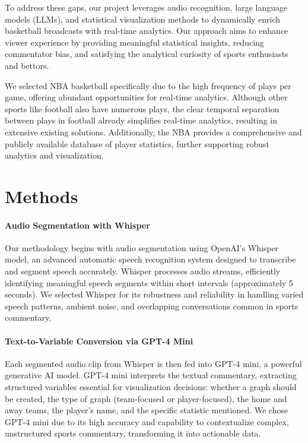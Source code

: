 \documentclass{article}
\begin{document}
To address these gaps, our project leverages audio recognition, large language models (LLMs), and statistical visualization methods to dynamically enrich basketball broadcasts with real-time analytics. Our approach aims to enhance viewer experience by providing meaningful statistical insights, reducing commentator bias, and satisfying the analytical curiosity of sports enthusiasts and bettors.

We selected NBA basketball specifically due to the high frequency of plays per game, offering abundant opportunities for real-time analytics. Although other sports like football also have numerous plays, the clear temporal separation between plays in football already simplifies real-time analytics, resulting in extensive existing solutions. Additionally, the NBA provides a comprehensive and publicly available database of player statistics, further supporting robust analytics and visualization.

\section{Methods}

\paragraph{Audio Segmentation with Whisper}
Our methodology begins with audio segmentation using OpenAI's Whisper model, an advanced automatic speech recognition system designed to transcribe and segment speech accurately. Whisper processes audio streams, efficiently identifying meaningful speech segments within short intervals (approximately 5 seconds). We selected Whisper for its robustness and reliability in handling varied speech patterns, ambient noise, and overlapping conversations common in sports commentary.

\paragraph{Text-to-Variable Conversion via GPT-4 Mini}
Each segmented audio clip from Whisper is then fed into GPT-4 mini, a powerful generative AI model. GPT-4 mini interprets the textual commentary, extracting structured variables essential for visualization decisions: whether a graph should be created, the type of graph (team-focused or player-focused), the home and away teams, the player's name, and the specific statistic mentioned. We chose GPT-4 mini due to its high accuracy and capability to contextualize complex, unstructured sports commentary, transforming it into actionable data.
\end{document}
